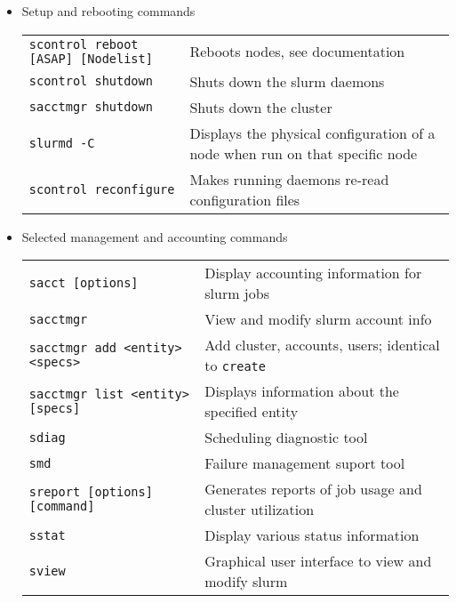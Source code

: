 \begin{itemize}
\item Setup and rebooting commands \\
\begin{tabular}{l p{3.4in}}
\texttt{scontrol reboot [ASAP] [Nodelist]} & Reboots nodes, see documentation \\
\texttt{scontrol shutdown} & Shuts down the slurm daemons \\
\texttt{sacctmgr shutdown} & Shuts down the cluster \\
\texttt{slurmd -C} & Displays the physical configuration of a node when run on that specific node \\
\texttt{scontrol reconfigure} & Makes running daemons re-read configuration files \\
\end{tabular}

\item Selected management and accounting commands \\
\begin{tabular}{l p{3.4in}}
\texttt{sacct [options]} & Display accounting information for slurm jobs \\
\texttt{sacctmgr} & View and modify slurm account info \\
\texttt{sacctmgr add <entity> <specs>} & Add cluster, accounts, users; identical to \texttt{create} \\
\texttt{sacctmgr list <entity> [specs]} & Displays information about the specified entity\\
\texttt{sdiag} & Scheduling diagnostic tool \\
\texttt{smd} & Failure management suport tool \\
\texttt{sreport [options] [command]} & Generates reports of job usage and cluster utilization \\
\texttt{sstat} & Display various status information \\
\texttt{sview} & Graphical user interface to view and modify slurm \\
\end{tabular}



\end{itemize}
